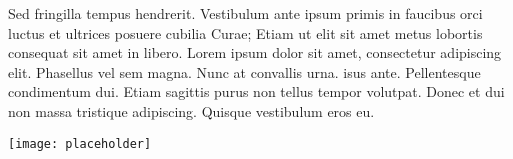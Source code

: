 \documentclass[landscape,a0paper,fontscale=0.285]{baposter} %
\begin{document}
\begin{poster}
{    %

        \begin{multicols}{2}
    \vspace{1em}
    Sed fringilla tempus hendrerit. Vestibulum ante ipsum primis in faucibus orci luctus et ultrices posuere cubilia Curae; Etiam ut elit sit amet metus lobortis consequat sit amet in libero. Lorem ipsum dolor sit amet, consectetur adipiscing elit. Phasellus vel sem magna. Nunc at convallis urna. isus ante. Pellentesque condimentum dui. Etiam sagittis purus non tellus tempor volutpat. Donec et dui non massa tristique adipiscing. Quisque vestibulum eros eu.

        \begin{center}
    \texttt{[image: placeholder]}
    \end{center}

    \end{multicols}
}




\end{poster}
\end{document}
